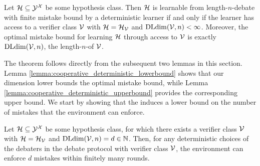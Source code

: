 \documentclass[anon]{alt2027} %
\begin{document}
\begin{theorem}
Let ${{\mathcal H}}\subseteq {\mathcal Y}^{\mathcal X}$ be some hypothesis class. Then ${{\mathcal H}}$ is learnable from length-$n$-debate with finite mistake bound by a deterministic learner if and only if the learner has access to a verifier class ${\mathcal V}$ with ${{\mathcal H}} = {{\mathcal H}}_{\mathcal V}$ and $\mathrm{DLdim}({\mathcal V}, n) <\infty$.
Moreover, the optimal mistake bound for learning ${{\mathcal H}}$ through access to ${\mathcal V}$ is exactly $\mathrm{DLdim}({\mathcal V}, n)$, the length-$n$-\debatedimname of ${\mathcal V}$.
\end{theorem}

The theorem follows directly from the subsequent two lemmas in this section. Lemma \ref{lemma:cooperative_deterministic_lowerbound} shows that our dimension lower bounds the optimal mistake bound, while Lemma \ref{lemma:cooperative_deterministic_upperbound} provides the corresponding upper bound.
We start by showing that the \debatedimname induces a lower bound on the number of mistakes that the environment can enforce.

\begin{lemma}\label{lemma:cooperative_deterministic_lowerbound}
Let ${{\mathcal H}}\subseteq {\mathcal Y}^{\mathcal X}$ be some hypothesis class, for which there exists a verifier class ${\mathcal V}$ with ${{\mathcal H}} = {{\mathcal H}}_{\mathcal V}$ and $\mathrm{DLdim}({\mathcal V}, n) = d \in \mathbb{N}$. Then, for any deterministic choices of the debaters in the debate protocol with verifier class ${\mathcal V}$, the environment can enforce $d$ mistakes within finitely many rounds.
\end{lemma}
\end{document}
